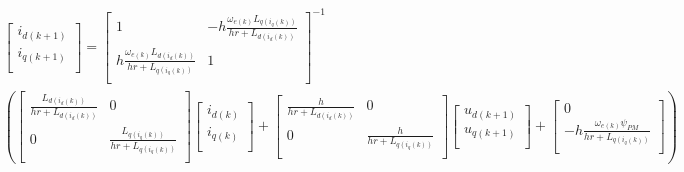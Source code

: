 \begin{subequations}
	\begin{equation}
		\begin{aligned}
			\begin{bmatrix}
				i_{d(k+1)} \\
				i_{q(k+1)} \\
			\end{bmatrix}
			=
			\begin{bmatrix}
				1                                                    & -h\frac{\omega_{e(k)}L_{q(i_q(k))}}{hr+L_{d(i_d(k))}} \\
				h\frac{\omega_{e(k)}L_{d(i_d(k))}}{hr+L_{q(i_q(k))}} & 1                                                     \\
			\end{bmatrix}^{-1} \\
			\left(
			\begin{bmatrix}
					\frac{L_{d(i_d(k))}}{hr+L_{d(i_d(k))}} & 0                                      \\
					0                                      & \frac{L_{q(i_q(k))}}{hr+L_{q(i_q(k))}} \\
				\end{bmatrix}
			\begin{bmatrix}
					i_{d(k)} \\
					i_{q(k)} \\
				\end{bmatrix}
			+
			\begin{bmatrix}
					\frac{h}{hr+L_{d(i_d(k))}} & 0                          \\
					0                          & \frac{h}{hr+L_{q(i_q(k))}} \\
				\end{bmatrix}
			\begin{bmatrix}
					u_{d(k+1)} \\
					u_{q(k+1)} \\
				\end{bmatrix}
			+
			\begin{bmatrix}
					0                                                 \\
					-h\frac{\omega_{e(k)}\psi_{PM}}{hr+L_{q(i_q(k))}} \\
				\end{bmatrix}
			\right)
		\end{aligned}
	\end{equation}


\end{subequations}
